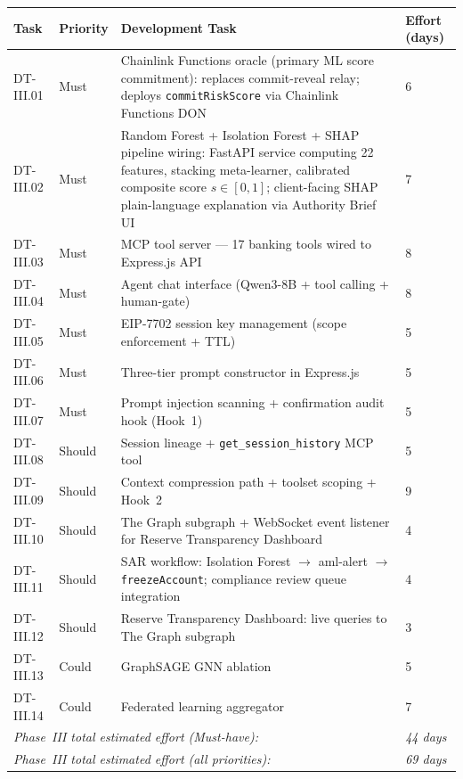 \documentclass[12pt,a4paper]{report}
\newcommand{\tableheadcolor}{\rowcolor{TableHeadBg}}
\begin{document}
\begin{table}[H]
\centering
\begin{tabular}{p{1.8cm}p{1.8cm}p{7.5cm}p{1.5cm}}
\toprule
\tableheadcolor
\textbf{Task} & \textbf{Priority} & \textbf{Development Task} & \textbf{Effort (days)} \\
\midrule
DT-III.01 & Must & Chainlink Functions oracle (primary ML score commitment): replaces commit-reveal relay; deploys \texttt{commitRiskScore} via Chainlink Functions DON & 6 \\
DT-III.02 & Must & Random Forest + Isolation Forest + SHAP pipeline wiring: FastAPI service computing 22 features, stacking meta-learner, calibrated composite score $s \in [0,1]$; client-facing SHAP plain-language explanation via Authority Brief UI & 7 \\
DT-III.03 & Must & MCP tool server --- 17 banking tools wired to Express.js API & 8 \\
DT-III.04 & Must & Agent chat interface (Qwen3-8B + tool calling + human-gate) & 8 \\
DT-III.05 & Must & EIP-7702 session key management (scope enforcement + TTL) & 5 \\
DT-III.06 & Must & Three-tier prompt constructor in Express.js & 5 \\
DT-III.07 & Must & Prompt injection scanning + confirmation audit hook (Hook~1) & 5 \\
DT-III.08 & Should & Session lineage + \texttt{get\_session\_history} MCP tool & 5 \\
DT-III.09 & Should & Context compression path + toolset scoping + Hook~2 & 9 \\
DT-III.10 & Should & The Graph subgraph + WebSocket event listener for Reserve Transparency Dashboard & 4 \\
DT-III.11 & Should & SAR workflow: Isolation Forest $\to$ aml-alert $\to$ \texttt{freezeAccount}; compliance review queue integration & 4 \\
DT-III.12 & Should & Reserve Transparency Dashboard: live queries to The Graph subgraph & 3 \\
DT-III.13 & Could & GraphSAGE GNN ablation & 5 \\
DT-III.14 & Could & Federated learning aggregator & 7 \\
\multicolumn{3}{l}{\textit{Phase~III total estimated effort (Must-have):}} & \textit{44 days} \\
\multicolumn{3}{l}{\textit{Phase~III total estimated effort (all priorities):}} & \textit{69 days} \\
\bottomrule
\end{tabular}
\end{table}
\end{document}
